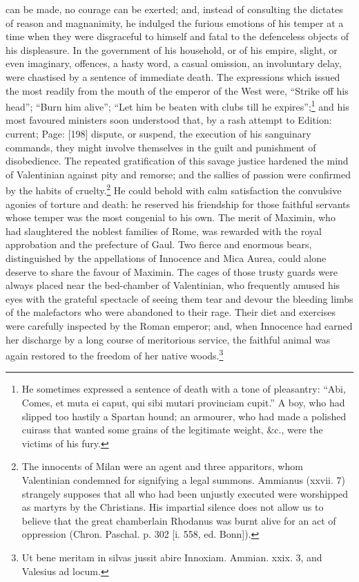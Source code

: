 can be made, no courage can be exerted; and, instead of consulting the dictates of reason and magnanimity, he indulged the furious emotions of his temper at a time when they were disgraceful to himself and fatal to the defenceless objects of his displeasure. In the government of his household, or of his empire, slight, or even imaginary, offences, a hasty word, a casual omission, an involuntary delay, were chastised by a sentence of immediate death. The expressions which issued the most readily from the mouth of the emperor of the West were, \texthebrew{“}Strike off his head\texthebrew{}”; \texthebrew{“}Burn him alive\texthebrew{}”; \texthebrew{“}Let him be beaten with clubs till he expires\texthebrew{}”;\footnote{He sometimes expressed a sentence of death with a tone of pleasantry: \texthebrew{“}Abi, Comes, et muta ei caput, qui sibi mutari provinciam cupit.\texthebrew{}” A boy, who had slipped too hastily a Spartan hound; an armourer, who had made a polished cuirass that wanted some grains of the legitimate weight, \&c., were the victims of his fury.} and his most favoured ministers soon understood that, by a rash attempt to Edition: current; Page: [198] dispute, or suspend, the execution of his sanguinary commands, they might involve themselves in the guilt and punishment of disobedience. The repeated gratification of this savage justice hardened the mind of Valentinian against pity and remorse; and the sallies of passion were confirmed by the habits of cruelty.\footnote{The innocents of Milan were an agent and three apparitors, whom Valentinian condemned for signifying a legal summons. Ammianus (xxvii. 7) strangely supposes that all who had been unjustly executed were worshipped as martyrs by the Christians. His impartial silence does not allow us to believe that the great chamberlain Rhodanus was burnt alive for an act of oppression (Chron. Paschal. p. 302 [i. 558, ed. Bonn]).} He could behold with calm satisfaction the convulsive agonies of torture and death: he reserved his friendship for those faithful servants whose temper was the most congenial to his own. The merit of Maximin, who had slaughtered the noblest families of Rome, was rewarded with the royal approbation and the prefecture of Gaul. Two fierce and enormous bears, distinguished by the appellations of Innocence and Mica Aurea, could alone deserve to share the favour of Maximin. The cages of those trusty guards were always placed near the bed-chamber of Valentinian, who frequently amused his eyes with the grateful spectacle of seeing them tear and devour the bleeding limbs of the malefactors who were abandoned to their rage. Their diet and exercises were carefully inspected by the Roman emperor; and, when Innocence had earned her discharge by a long course of meritorious service, the faithful animal was again restored to the freedom of her native woods.\footnote{Ut bene meritam in silvas jussit abire Innoxiam. Ammian. xxix. 3, and Valesius ad locum.}


